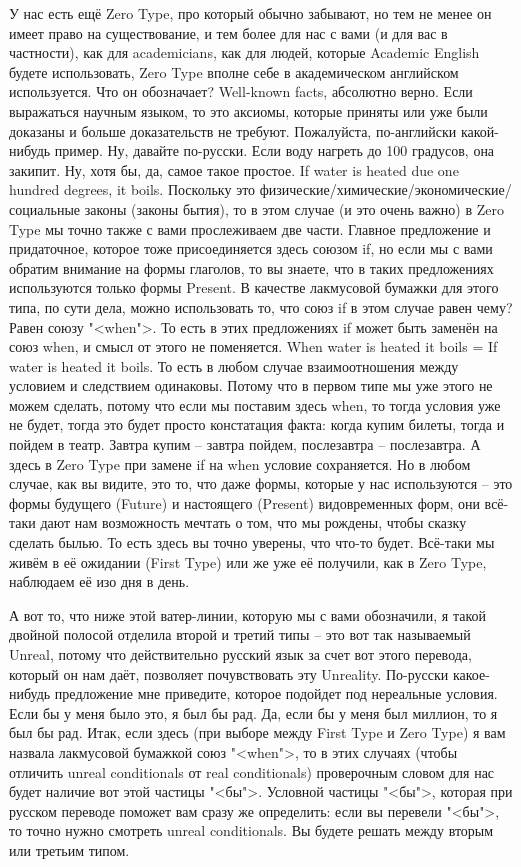 \documentclass[main.tex]{subfiles}
\begin{document}
У нас есть ещё Zero Type, про который обычно забывают, но тем не менее он имеет право на существование, и тем более для нас с вами (и для вас в частности), как для academicians, как для людей, которые Academic English будете использовать, Zero Type вполне себе в академическом английском используется.
Что он обозначает?
Well-known facts, абсолютно верно.
Если выражаться научным языком, то это аксиомы, которые приняты или уже были доказаны и больше доказательств не требуют.
Пожалуйста, по-английски какой-нибудь пример.
Ну, давайте по-русски.
Если воду нагреть до 100 градусов, она закипит.
Ну, хотя бы, да, самое такое простое.
If water is heated due one hundred degrees, it boils.
Поскольку это физические/химические/экономические/социальные законы (законы бытия), то в этом случае (и это очень важно) в Zero Type мы точно также с вами прослеживаем две части.
Главное предложение и придаточное, которое тоже присоединяется здесь союзом if, но если мы с вами обратим внимание на формы глаголов, то вы знаете, что в таких предложениях используются только формы Present.
В качестве лакмусовой бумажки для этого типа, по сути дела, можно использовать то, что союз if в этом случае равен чему?
Равен союзу "<when">.
То есть в этих предложениях if может быть заменён на союз when, и смысл от этого не поменяется.
When water is heated it boils = If water is heated it boils.
То есть в любом случае взаимоотношения между условием и следствием одинаковы.
Потому что в первом типе мы уже этого не можем сделать, потому что если мы поставим здесь when, то тогда условия уже не будет, тогда это будет просто констатация факта: когда купим билеты, тогда и пойдем в театр.
Завтра купим -- завтра пойдем, послезавтра -- послезавтра.
А здесь в Zero Type при замене if на when условие сохраняется.
Но в любом случае, как вы видите, это то, что даже формы, которые у нас используются -- это формы будущего (Future) и настоящего (Present) видовременных форм, они всё-таки дают нам возможность мечтать о том, что мы рождены, чтобы сказку сделать былью.
То есть здесь вы точно уверены, что что-то будет.
Всё-таки мы живём в её ожидании (First Type) или же уже её получили, как в Zero Type, наблюдаем её изо дня в день.

А вот то, что ниже этой ватер-линии, которую мы с вами обозначили, я такой двойной полосой отделила второй и третий типы -- это вот так называемый Unreal, потому что действительно русский язык за счет вот этого перевода, который он нам даёт, позволяет почувствовать эту Unreality.
По-русски какое-нибудь предложение мне приведите, которое подойдет под нереальные условия.
Если бы у меня было это, я был бы рад.
Да, если бы у меня был миллион, то я был бы рад.
Итак, если здесь (при выборе между First Type и Zero Type) я вам назвала лакмусовой бумажкой союз "<when">, то в этих случаях (чтобы отличить unreal conditionals от real conditionals) проверочным словом для нас будет наличие вот этой частицы "<бы">.
Условной частицы "<бы">, которая при русском переводе поможет вам сразу же определить: если вы перевели "<бы">, то точно нужно смотреть unreal conditionals.
Вы будете решать между вторым или третьим типом.
\end{document}
